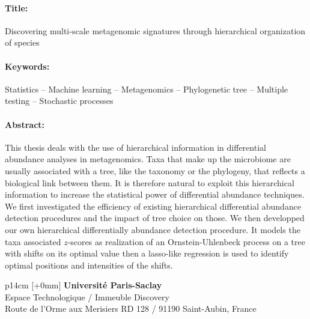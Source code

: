 \documentclass[12pt,a4paper]{reedthesis}
\theoremstyle{definition}
\theoremstyle{definition}
\theoremstyle{definition}
\theoremstyle{remark}
\begin{document}
\begin{mdframed}[linecolor=Prune,linewidth=1]
\vspace{-.25cm}
\paragraph*{Title:} Discovering multi-scale metagenomic signatures through hierarchical organization of species
\begin{small}
\vspace{-.25cm}
\paragraph*{Keywords:} Statistics -- Machine learning -- Metagenomics -- Phylogenetic tree -- Multiple testing -- Stochastic processes

\vspace{-.5cm}
\begin{multicols}{2}
\paragraph*{Abstract:} This thesis deals with the use of hierarchical information in differential abundance
analyses in metagenomics. Taxa that make up the microbiome are
usually associated with a tree, like the taxonomy or the phylogeny, that reflects a
biological link between them. It is therefore natural to exploit this hierarchical
information to increase the statistical power of differential abundance techniques.
We first investigated the efficiency of existing hierarchical
differential abundance detection procedures and the impact of tree choice
on those. We then developped our own hierarchical differentially
abundance detection procedure. It models the taxa associated \(z\)-scores as realization
of an Ornstein-Uhlenbeck process on a tree with shifts on its optimal value
then a lasso-like regression is used to identify optimal positions and intensities
of the shifts. \newline
\end{multicols}
\end{small}
\end{mdframed}

\vfill
{}\selectfont
\noindent\begin{tabular}{p{14cm}}
[+0mm]{\small {\color{Prune} {\bf Université Paris-Saclay}\\
{\scriptsize Espace Technologique / Immeuble Discovery}\\
{\scriptsize  Route de l’Orme aux Merisiers RD 128 / 91190 Saint-Aubin, France}}}\\\mbox{}
\end{tabular}

\end{document}
